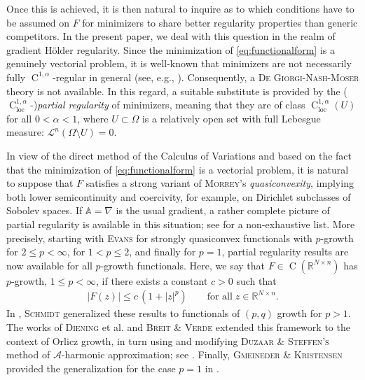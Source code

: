 \documentclass[a4paper,11pt]{amsart}
\numberwithin{equation}{section}
\newcommand{\R}{\mathbb{R}}
\newcommand{\locc}{\operatorname{loc}}
\newcommand{\hold}{\operatorname{C}}
\begin{document}
	Once this is achieved, it is then natural to inquire as to which conditions have to be assumed on $F$ for minimizers to share better regularity properties than generic competitors. In the present paper, we deal with this question in the realm of gradient H\"{o}lder regularity. Since the minimization of \eqref{eq:functionalform} is a genuinely vectorial problem, it is well-known that minimizers are not necessarily fully $\hold^{1, \alpha}$-regular in general (see, e.g., \cite{DeGiorgi1968, giusti1968esempio, mazya_examples_1968}). Consequently, a \textsc{De Giorgi-Nash-Moser} theory is not available. In this regard, a suitable substitute is provided by the ($\hold_{\locc}^{1,\alpha}$-)\emph{partial regularity} of  minimizers, meaning that they are of class $\hold^{1,\alpha}_\text{loc}(U)$ for all $0<\alpha<1$, where $U\subset\Omega$ is a relatively open set with full Lebesgue measure: $\mathscr{L}^{n}(\Omega\setminus U)=0$.
	
	In view of the direct method of the Calculus of Variations and based on the fact that the minimization of \eqref{eq:functionalform} is a vectorial problem, it is natural to suppose that $F$ satisfies a strong variant of \textsc{Morrey}'s \emph{quasiconvexity}, implying both lower semicontinuity and coercivity, for example, on Dirichlet subclasses of Sobolev spaces.
	If $\mathbb{A}=\nabla$ is the usual gradient, a rather complete picture of partial regularity is available in this situation; see \cite{acerbi_regularity_2001, bärlin2022mathcalaharmonic, carozza_partial_1998, carozza_regularity_1996,
		Filippis1,  Filippis2, diening_partial_2012, evans_quasiconvexity_1986,  gmeineder_partial_2019-1, gmeineder_quasiconvex_2024,  kristensen_partial_2003, kuusi_partial_2016, DarkSide,schmidt1, schmidt_regularity_2009} for a non-exhaustive list. More precisely, starting with \textsc{Evans} \cite{evans_quasiconvexity_1986} for strongly quasiconvex functionals with $p$-growth for $2 \leq p < \infty$, \cite{carozza_partial_1998, carozza_regularity_1996} for $1 < p \leq 2$, and finally \cite{gmeineder_partial_2019-1} for $p=1$, partial regularity results are now available for all $p$-growth functionals. Here, we say that $F\in\hold(\R^{N\times n})$ has $p$-growth, $1\leq p<\infty$, if there exists a constant $c>0$ such that 
	\begin{align}\label{eq:pgrowth}
		|F(z)|\leq c\,(1+|z|^{p})\qquad\text{for all}\;z\in\R^{N\times n}. 
	\end{align}
	{In \cite{schmidt1,schmidt_regularity_2009}, \textsc{Schmidt} generalized these results to functionals of $(p,q)$ growth for $p>1$.}  The works of \textsc{Diening} et al. \cite{diening_partial_2012} and \textsc{Breit \& Verde} \cite{breit_quasiconvex} extended {this framework} to the context of Orlicz growth, in turn using and modifying \textsc{Duzaar \& Steffen's} method of $\mathcal{A}$-harmonic approximation; see \cite{duzaar_optimal_2003}. {Finally, \textsc{Gmeineder} \& \textsc{Kristensen} provided the generalization for the case $p=1$ in \cite{gmeineder_quasiconvex_2024}.}
	
\end{document}
